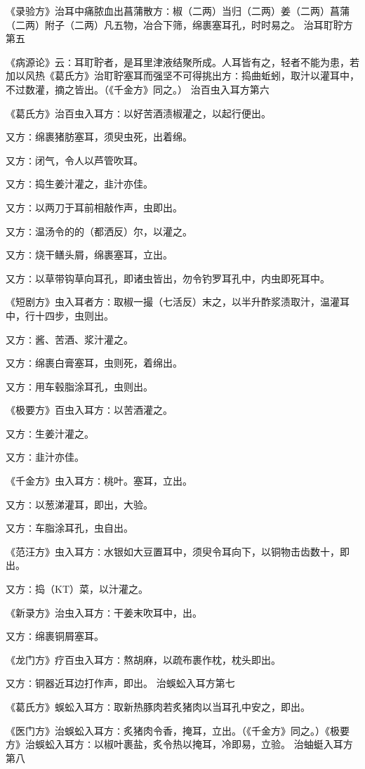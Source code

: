 \documentclass[a4paper,12pt,UTF8,twoside]{ctexbook}
\begin{document}
《录验方》治耳中痛脓血出菖蒲散方∶椒（二两）当归（二两）姜（二两）菖蒲（二两）附子（二两）凡五物，冶合下筛，绵裹塞耳孔，时时易之。
治耳耵聍方第五

《病源论》云∶耳耵聍者，是耳里津液结聚所成。人耳皆有之，轻者不能为患，若加以风热《葛氏方》治耵聍塞耳而强坚不可得挑出方∶捣曲蚯蚓，取汁以灌耳中，不过数灌，摘之皆出。（《千金方》同之。）
治百虫入耳方第六

《葛氏方》治百虫入耳方∶以好苦酒渍椒灌之，以起行便出。

又方∶绵裹猪肪塞耳，须臾虫死，出着绵。

又方∶闭气，令人以芦管吹耳。

又方∶捣生姜汁灌之，韭汁亦佳。

又方∶以两刀于耳前相敲作声，虫即出。

又方∶温汤令的的（都洒反）尔，以灌之。

又方∶烧干鳝头屑，绵裹塞耳，立出。

又方∶以草带钩草向耳孔，即诸虫皆出，勿令钓罗耳孔中，内虫即死耳中。

《短剧方》虫入耳者方∶取椒一撮（七活反）末之，以半升酢浆渍取汁，温灌耳中，行十四步，虫则出。

又方∶酱、苦酒、浆汁灌之。

又方∶绵裹白膏塞耳，虫则死，着绵出。

又方∶用车毂脂涂耳孔，虫则出。

《极要方》百虫入耳方∶以苦酒灌之。

又方∶生姜汁灌之。

又方∶韭汁亦佳。

《千金方》虫入耳方∶桃叶。塞耳，立出。

又方∶以葱涕灌耳，即出，大验。

又方∶车脂涂耳孔，虫自出。

《范汪方》虫入耳方∶水银如大豆置耳中，须臾令耳向下，以铜物击齿数十，即出。

又方∶捣（KT）菜，以汁灌之。

《新录方》治虫入耳方∶干姜末吹耳中，出。

又方∶绵裹铜屑塞耳。

《龙门方》疗百虫入耳方∶熬胡麻，以疏布裹作枕，枕头即出。

又方∶铜器近耳边打作声，即出。
治蜈蚣入耳方第七

《葛氏方》蜈蚣入耳方∶取新热豚肉若炙猪肉以当耳孔中安之，即出。

《医门方》治蜈蚣入耳方∶炙猪肉令香，掩耳，立出。（《千金方》同之。）《极要方》治蜈蚣入耳方∶以椒叶裹盐，炙令热以掩耳，冷即易，立验。
治蚰蜓入耳方第八
\end{document}
